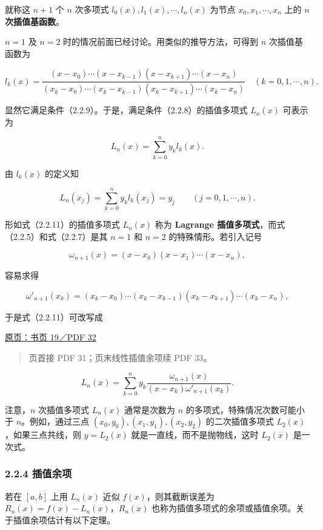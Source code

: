 \documentclass[
  10pt,
  fontset=fandol]{ctexart}
\begin{document}
就称这 \(n+1\) 个 \(n\) 次多项式 \(l_0(x),l_1(x),\cdots,l_n(x)\) 为节点 \(x_0,x_1,\cdots,x_n\) 上的 \textbf{\(n\) 次插值基函数}。

\(n=1\) 及 \(n=2\) 时的情况前面已经讨论。用类似的推导方法，可得到 \(n\) 次插值基函数为

\[
l_k(x)=
\frac{(x-x_0)\cdots(x-x_{k-1})(x-x_{k+1})\cdots(x-x_n)}
{(x_k-x_0)\cdots(x_k-x_{k-1})(x_k-x_{k+1})\cdots(x_k-x_n)}
\quad(k=0,1,\cdots,n).
\tag{2.2.10}
\]

显然它满足条件（2.2.9）。于是，满足条件（2.2.8）的插值多项式 \(L_n(x)\) 可表示为

\[
L_n(x)=\sum_{k=0}^{n}y_kl_k(x).
\tag{2.2.11}
\]

由 \(l_k(x)\) 的定义知

\[
L_n(x_j)=\sum_{k=0}^{n}y_kl_k(x_j)=y_j
\qquad(j=0,1,\cdots,n).
\]

形如式（2.2.11）的插值多项式 \(L_n(x)\) 称为 \textbf{Lagrange 插值多项式}，而式（2.2.5）和式（2.2.7）是其 \(n=1\) 和 \(n=2\) 的特殊情形。若引入记号

\[
\omega_{n+1}(x)=(x-x_0)(x-x_1)\cdots(x-x_n),
\tag{2.2.12}
\]

容易求得

\[
\omega'_{n+1}(x_k)
=(x_k-x_0)\cdots(x_k-x_{k-1})(x_k-x_{k+1})\cdots(x_k-x_n),
\]

于是式（2.2.11）可改写成

\href{../../source-images/pdf-032.jpeg}{原页：书页 19／PDF 32}

\begin{quote}
页首接 PDF 31；页末线性插值余项续 PDF 33。
\end{quote}

\[
L_n(x)=\sum_{k=0}^{n}y_k
\frac{\omega_{n+1}(x)}
{(x-x_k)\omega'_{n+1}(x_k)}.
\tag{2.2.13}
\]

注意，\(n\) 次插值多项式 \(L_n(x)\) 通常是次数为 \(n\) 的多项式，特殊情况次数可能小于 \(n\)。例如，通过三点 \((x_0,\allowbreak y_0),\allowbreak (x_1,\allowbreak y_1),\allowbreak (x_2,\allowbreak y_2)\) 的二次插值多项式 \(L_2(x)\)，如果三点共线，则 \(y=L_2(x)\) 就是一直线，而不是抛物线，这时 \(L_2(x)\) 是一次式。

\subsubsection{2.2.4 插值余项}\label{ux63d2ux503cux4f59ux9879}

若在 \([a,b]\) 上用 \(L_n(x)\) 近似 \(f(x)\)，则其截断误差为 \(R_n(x)=f(x)-L_n(x)\)，\(R_n(x)\) 也称为插值多项式的余项或插值余项。关于插值余项估计有以下定理。
\end{document}
